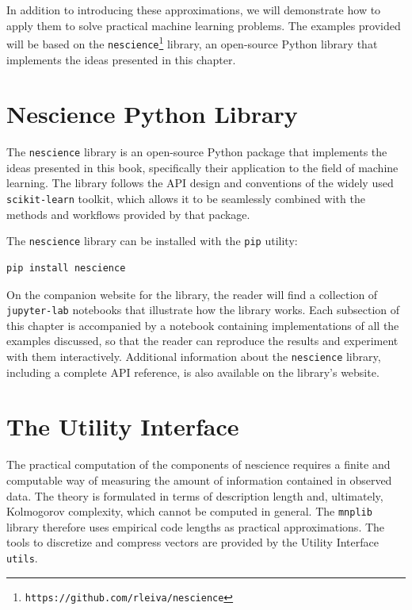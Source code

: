 In addition to introducing these approximations, we will demonstrate how to apply them to solve practical machine learning problems. The examples provided will be based on the \texttt{nescience}\footnote{\texttt{https://github.com/rleiva/nescience}} library, an open-source Python library that implements the ideas presented in this chapter.

%
%

\section{Nescience Python Library}
\label{sec:nescience_library}

The \texttt{nescience} library is an open-source Python package that implements the ideas presented in this book, specifically their application to the field of machine learning. The library follows the API design and conventions of the widely used \texttt{scikit-learn} toolkit, which allows it to be seamlessly combined with the methods and workflows provided by that package.

The \texttt{nescience} library can be installed with the \texttt{pip} utility:

\begin{sourcecode}
{\scriptsize \begin{verbatim}
pip install nescience
\end{verbatim}}
\end{sourcecode}

On the companion website for the library, the reader will find a collection of \texttt{jupyter-lab} notebooks that illustrate how the library works. Each subsection of this chapter is accompanied by a notebook containing implementations of all the examples discussed, so that the reader can reproduce the results and experiment with them interactively. Additional information about the \texttt{nescience} library, including a complete API reference, is also available on the library's website.

%
%

\section{The Utility Interface}
\label{sec:utility_interface}

The practical computation of the components of nescience requires a finite and computable way of measuring the amount of information contained in observed data. The theory is formulated in terms of description length and, ultimately, Kolmogorov complexity, which cannot be computed in general. The \texttt{mnplib} library therefore uses empirical code lengths as practical approximations. The tools to discretize and compress vectors are provided by the Utility Interface \texttt{utils}.

